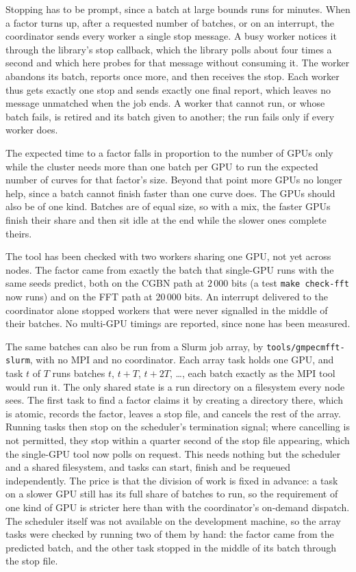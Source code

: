 \documentclass[11pt,a4paper]{article}
\newcommand{\code}[1]{\texttt{#1}}
\begin{document}
Stopping has to be prompt, since a batch at large bounds runs for minutes. When a factor
turns up, after a requested number of batches, or on an interrupt, the coordinator sends every
worker a single stop message. A busy worker notices it through the library's stop callback,
which the library polls about four times a second and which here probes for that message
without consuming it. The worker abandons its batch, reports once more, and then receives the
stop. Each worker thus gets exactly one stop and sends exactly one final report, which leaves
no message unmatched when the job ends. A worker that cannot run, or whose batch fails, is
retired and its batch given to another; the run fails only if every worker does.

The expected time to a factor falls in proportion to the number of GPUs only while the cluster
needs more than one batch per GPU to run the expected number of curves for that factor's size.
Beyond that point more GPUs no longer help, since a batch cannot finish faster than one curve
does. The GPUs should also be of one kind. Batches are of equal size, so with a mix, the
faster GPUs finish their share and then sit idle at the end while the slower ones complete
theirs.

The tool has been checked with two workers sharing one GPU, not yet across nodes. The factor
came from exactly the batch that single-GPU runs with the same seeds predict, both on the CGBN
path at $2\,000$ bits (a test \code{make check-fft} now runs) and on the FFT path at
$20\,000$ bits. An interrupt delivered to the coordinator alone stopped workers that were never
signalled in the middle of their batches. No multi-GPU timings are reported, since none has been
measured.

The same batches can also be run from a Slurm job array, by \code{tools/gmpecmfft-slurm}, with
no MPI and no coordinator. Each array task holds one GPU, and task $t$ of $T$ runs batches $t$,
$t + T$, $t + 2T$, \ldots, each batch exactly as the MPI tool would run it. The only shared state
is a run directory on a filesystem every node sees. The first task to find a factor claims it by
creating a directory there, which is atomic, records the factor, leaves a stop file, and cancels
the rest of the array. Running tasks then stop on the scheduler's termination signal; where
cancelling is not permitted, they stop within a quarter second of the stop file appearing,
which the single-GPU tool now polls on request. This needs nothing but the scheduler and a
shared filesystem, and tasks can start, finish and be requeued independently. The price is that
the division of work is fixed in advance: a task on a slower GPU still has its full share of
batches to run, so the requirement of one kind of GPU is stricter here than with the
coordinator's on-demand dispatch. The scheduler itself was not available on the development
machine, so the array tasks were checked by running two of them by hand: the factor came from the
predicted batch, and the other task stopped in the middle of its batch through the stop file.
\end{document}
